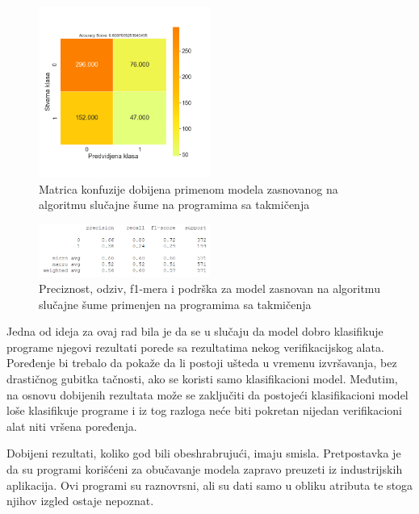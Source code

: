 \documentclass[12pt,oneside]{memoir}
\begin{document}
\begin{figure}[!ht]
  \centering
  \includegraphics[width=0.5\textwidth]{RF_c_files_confussion_matrix}
  \caption{Matrica konfuzije dobijena primenom modela zasnovanog na algoritmu slučajne šume na programima sa takmičenja}
  \label{fig:confmfinal}
\end{figure}

\begin{figure}[!ht]
  \centering
  \includegraphics[width=0.5\textwidth]{extra_final}
  \caption{Preciznost, odziv, f1-mera i podrška za model zasnovan na algoritmu slučajne šume primenjen na programima sa takmičenja}
  \label{fig:extrafinal}
\end{figure}

Jedna od ideja za ovaj rad bila je da se u slučaju da model dobro klasifikuje programe njegovi rezultati porede sa rezultatima nekog verifikacijskog alata. Poređenje bi trebalo da pokaže da li postoji ušteda u vremenu izvršavanja, bez drastičnog gubitka tačnosti, ako se koristi samo klasifikacioni model. Međutim, na osnovu dobijenih rezultata može se zaključiti da postojeći klasifikacioni model loše klasifikuje programe i iz tog razloga neće biti pokretan nijedan verifikacioni alat niti vršena poređenja.

Dobijeni rezultati, koliko god bili obeshrabrujući, imaju smisla. Pretpostavka je da su programi korišćeni za obučavanje modela zapravo preuzeti iz industrijskih aplikacija. Ovi programi su raznovrsni, ali su dati samo u obliku atributa te stoga njihov izgled ostaje nepoznat. 
\end{document}
